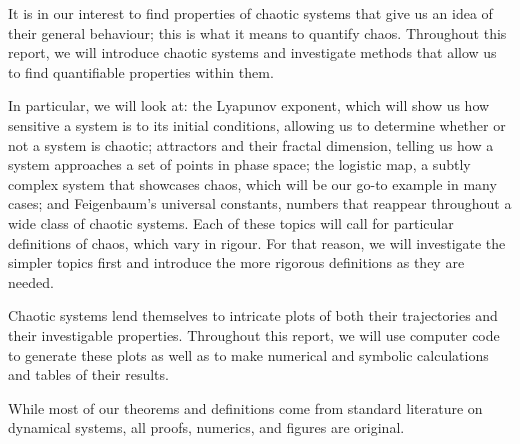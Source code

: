 It is in our interest to find properties of chaotic systems that give us an idea of their general behaviour; this is what it means to quantify chaos. Throughout this report, we will introduce chaotic systems and investigate methods that allow us to find quantifiable properties within them. 

In particular, we will look at: the Lyapunov exponent, which will show us how sensitive a system is to its initial conditions, allowing us to determine whether or not a system is chaotic; attractors and their fractal dimension, telling us how a system approaches a set of points in phase space; the logistic map, a subtly complex system that showcases chaos, which will be our go-to example in many cases; and Feigenbaum's universal constants, numbers that reappear throughout a wide class of chaotic systems. Each of these topics will call for particular definitions of chaos, which vary in rigour. For that reason, we will investigate the simpler topics first and introduce the more rigorous definitions as they are needed.

Chaotic systems lend themselves to intricate plots of both their trajectories and their investigable properties. Throughout this report, we will use computer code to generate these plots as well as to make numerical and symbolic calculations and tables of their results. 

While most of our theorems and definitions come from standard literature on dynamical systems, all proofs, numerics, and figures are original.
